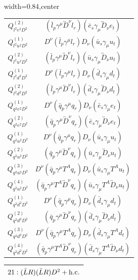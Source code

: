 \begin{table}[H]
\begin{center}
\begin{adjustbox}{width=0.84\textwidth,center}
\begin{minipage}[t]{5.9cm}
\begin{tabular}[t]{c|c}
%
$Q_{l^2e^2D^2}^{(2)}$  &  $(\bar l_p \gamma^\mu \overleftrightarrow{D}^\nu l_r) (\bar e_s \gamma_\mu \overleftrightarrow{D}_\nu e_t)$ \\
%
$Q_{l^2u^2D^2}^{(1)}$  &  $D^\nu (\bar l_p \gamma^\mu l_r) D_\nu (\bar u_s \gamma_\mu u_t)$  \\
%
$Q_{l^2u^2D^2}^{(2)}$  &  $(\bar l_p \gamma^\mu \overleftrightarrow{D}^\nu l_r) (\bar u_s \gamma_\mu \overleftrightarrow{D}_\nu u_t)$ \\
%
$Q_{l^2d^2D^2}^{(1)}$  &  $D^\nu (\bar l_p \gamma^\mu l_r) D_\nu (\bar d_s \gamma_\mu d_t)$  \\
%
$Q_{l^2d^2D^2}^{(2)}$  &  $(\bar l_p \gamma^\mu \overleftrightarrow{D}^\nu l_r) (\bar d_s \gamma_\mu \overleftrightarrow{D}_\nu d_t)$ \\
%
$Q_{q^2e^2D^2}^{(1)}$  &  $D^\nu (\bar q_p \gamma^\mu q_r) D_\nu (\bar e_s \gamma_\mu e_t)$  \\
%
$Q_{q^2e^2D^2}^{(2)}$  &  $(\bar q_p \gamma^\mu \overleftrightarrow{D}^\nu q_r) (\bar e_s \gamma_\mu \overleftrightarrow{D}_\nu e_t)$ \\
%
$Q_{q^2u^2D^2}^{(1)}$  &  $D^\nu (\bar q_p \gamma^\mu q_r) D_\nu (\bar u_s \gamma_\mu u_t)$  \\
%
$Q_{q^2u^2D^2}^{(2)}$  &  $(\bar q_p \gamma^\mu \overleftrightarrow{D}^\nu q_r) (\bar u_s \gamma_\mu \overleftrightarrow{D}_\nu u_t)$ \\
%
$Q_{q^2u^2D^2}^{(3)}$  &  $D^\nu (\bar q_p \gamma^\mu T^A q_r) D_\nu (\bar u_s \gamma_\mu T^A u_t)$  \\
%
$Q_{q^2u^2D^2}^{(4)}$  &  $(\bar q_p \gamma^\mu T^A  \overleftrightarrow{D}^\nu q_r) (\bar u_s \gamma_\mu T^A  \overleftrightarrow{D}_\nu u_t)$ \\
%
$Q_{q^2d^2D^2}^{(1)}$  &  $D^\nu (\bar q_p \gamma^\mu q_r) D_\nu (\bar d_s \gamma_\mu d_t)$  \\
%
$Q_{q^2d^2D^2}^{(2)}$  &  $(\bar q_p \gamma^\mu \overleftrightarrow{D}^\nu q_r) (\bar d_s \gamma_\mu \overleftrightarrow{D}_\nu d_t)$ \\
%
$Q_{q^2d^2D^2}^{(3)}$  &  $D^\nu (\bar q_p \gamma^\mu T^A q_r) D_\nu (\bar d_s \gamma_\mu T^A d_t)$  \\
%
$Q_{q^2d^2D^2}^{(4)}$  &  $(\bar q_p \gamma^\mu T^A  \overleftrightarrow{D}^\nu q_r) (\bar d_s \gamma_\mu T^A  \overleftrightarrow{D}_\nu d_t)$
\end{tabular}
\end{minipage}
\hspace{1cm}
\begin{minipage}[t]{5.7cm}
\renewcommand{\arraystretch}{1.5}
\begin{tabular}[t]{c|c}
\multicolumn{2}{c}{\boldmath$21:(\bar L R)(\bar L R)D^2 + \mathrm{h.c.}$} \\
\hline


\end{tabular}
\end{minipage}
\end{adjustbox}
\end{center}
\end{table}

